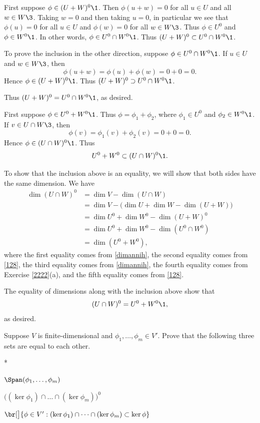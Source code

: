 \begin{Solution}
\begin{subtheorem}
\item
First suppose $\phi \in (U + W)^0\1$. Then $\phi(u + w) = 0$ for all $u \in U$ and all $w \in W\3$. Taking $w = 0$ and then taking $u = 0$, in particular we see that $\phi(u) = 0$ for all $u \in U$ and $\phi(w) = 0$ for all $w \in W\3$. Thus $\phi \in U^0$ and $\phi \in W^0\1$. In other words, $\phi \in U^0 \cap W^0\1$. Thus $(U + W)^0 \subset U^0 \cap W^0\1$.

To prove the inclusion in the other direction, suppose $\phi \in U^0 \cap W^0\1$. If $u \in U$ and $w \in W\3$, then
\[
\phi(u + w) = \phi(u) + \phi(w) = 0 + 0 = 0.
\]
Hence $\phi \in (U+W)^0\1$. Thus $(U + W)^0 \supset U^0 \cap W^0\1$.

Thus $(U + W)^0 = U^0 \cap W^0\1$, as desired.

\item
First suppose $\phi \in U^0 + W^0\1$. Thus $\phi = \phi_1 + \phi_2$, where $\phi_1 \in U^0$ and $\phi_2 \in W^0\1$. If $v \in U \cap W\3$, then
\[
\phi(v) = \phi_1(v) + \phi_2(v) = 0 + 0 = 0.
\]
Hence $\phi \in (U \cap W)^0\1$. Thus
\[
U^0 + W^0 \subset (U \cap W)^0\1.
\]

To show that the inclusion above is an equality, we will show that both sides have the same dimension. We have
\begin{align*}
\dim(U\cap W)^0 &= \dim V - \dim(U \cap W) \\
&= \dim V - \bigl(\dim U + \dim W - \dim(U+W) \bigr) \\
&= \dim U^0 + \dim W^0 - \dim(U+W)^0 \\
&= \dim U^0 + \dim W^0 - \dim(U^0 \cap W^0) \\
&= \dim( U^0 + W^0 ),
\end{align*}
where the first equality comes from \ref{dimannih}, the second equality comes from \ref{128}, the third equality comes from \ref{dimannih}, the fourth equality comes from Exercise \ref{2222}(a), and the fifth equality comes from \ref{128}.

The equality of dimensions along with the inclusion above show that
\[
(U \cap W)^0 = U^0 + W^0\1,
\]
as desired.
\end{subtheorem}
\end{Solution}

\exercise
Suppose $V$ is finite-dimensional and $\phi_1, \ldots, \phi_m \in V'\!$. Prove that the following three sets are equal to each other.\label{3intersectnull}
\begin{subtheorem}*
\item
$\Span(\phi_1, \dots, \phi_m)$
\item
$\bigl( (\ker \phi_1) \cap \dots \cap (\ker \phi_m)\bigr)^0$
\item
$\br[\big]{ \phi \in V': (\ker \phi_1) \cap \dots \cap (\ker \phi_m) \subset \ker \phi }$
\end{subtheorem}
\exercisesubtheoremend

